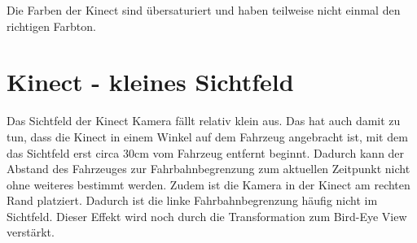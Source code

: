 Die Farben der Kinect sind übersaturiert und haben teilweise nicht einmal den richtigen Farbton.

\section{Kinect - kleines Sichtfeld}
\label{sec:sichtfeld}
Das Sichtfeld der Kinect Kamera fällt relativ klein aus.
Das hat auch damit zu tun, dass die Kinect in einem Winkel auf dem Fahrzeug angebracht ist, mit dem das Sichtfeld erst circa 30cm vom Fahrzeug entfernt beginnt.
Dadurch kann der Abstand des Fahrzeuges zur Fahrbahnbegrenzung zum aktuellen Zeitpunkt nicht ohne weiteres bestimmt werden. 
Zudem ist die Kamera in der Kinect am rechten Rand platziert.
Dadurch ist die linke Fahrbahnbegrenzung häufig nicht im Sichtfeld.
Dieser Effekt wird noch durch die Transformation zum Bird-Eye View verstärkt.

